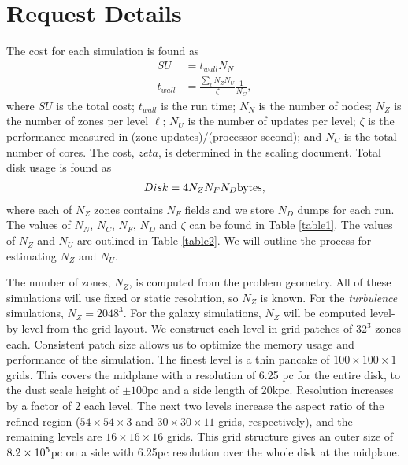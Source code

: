 \section{Request Details}


\label{sec.request}
The cost for each simulation is found as
\begin{align}
SU &= t_{wall} N_N\\
t_{wall} &= \frac{\sum_{\ell} N_Z N_U}{\zeta} \frac{1}{N_C},
\end{align}
where $SU$ is the total cost; $t_{wall}$ is the run time; $N_N$ is the number of
nodes; $N_Z$ is the number of zones per level $\ell$; $N_U$ is the number of
updates per level; $\zeta$ is
the performance measured in (zone-updates)/(processor-second); and $N_C$ is the
total number of cores.  The cost, $zeta$, is determined in the scaling document.
Total disk usage is found as
\begin{align}
	Disk = 4 N_Z N_F N_D \rm{bytes},
\end{align}
where each of $N_Z$ zones contains $N_F$ fields and we store $N_D$ dumps for
each run.  The values of $N_N$, $N_C$, $N_F$, $N_D$ and $\zeta$ can be found in
Table \ref{table1}.  The values of $N_Z$ and $N_U$ are outlined in Table
\ref{table2}.  We will outline the process for estimating $N_Z$ and $N_U$.


The number of zones, $N_Z$, is computed from the problem geometry.  All of these
simulations will use fixed or static resolution, so $N_Z$ is known.  
For the \emph{turbulence} simulations, $N_Z=2048^3$.  For the galaxy
simulations, $N_Z$ will be computed level-by-level from the grid layout.  We construct each level in grid patches of $32^3$ zones each.  
Consistent patch size allows us to optimize the memory usage and performance of the simulation.
The finest level is a thin pancake of
$100\times100\times1$ grids. This covers the midplane with a
resolution of 6.25 pc for 
the entire disk, to the dust scale height of $\pm 100$pc and a side length of
20kpc.
Resolution increases by a factor of 2 each level.  The next two levels increase
the aspect ratio of the refined region ($54\times54\times3$ and
$30\times30\times11$ grids, respectively), and the remaining levels are $16\times 16 \times 16$
grids.   This grid structure gives an outer size of $8.2\times {10^{5}}$pc on a side
with 6.25pc resolution over the whole disk at the midplane.  

